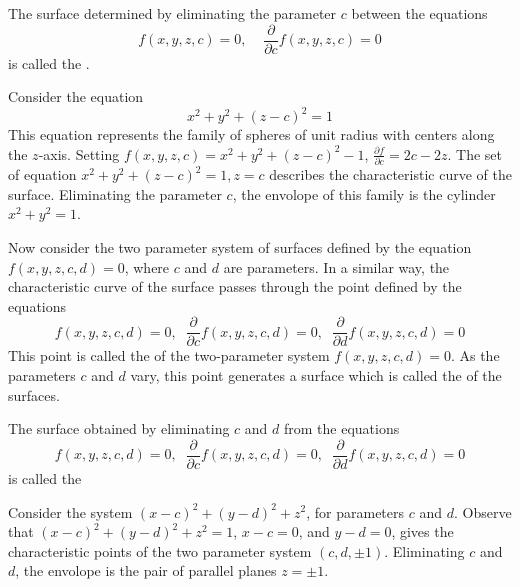     \begin{definition}
        The surface determined by eliminating the parameter $c$ between the equations  \begin{equation*}
            f(x,y,z,c) = 0,\;\;\;\;\frac{\partial}{\partial c}f(x,y,z,c) = 0
        \end{equation*}
        is called the .
    \end{definition}

    \begin{example}
        Consider the equation $$x^2+y^2+(z-c)^2 = 1$$ This equation represents the family of spheres of unit radius with centers along the $z$-axis. Setting $f(x,y,z,c) = x^2+y^2+(z-c)^2-1$, $\frac{\partial f}{\partial c} = 2c-2z$. The set of equation $x^2+y^2+(z-c)^2=1, z =c$ describes the characteristic curve of the surface. Eliminating the parameter $c$, the envolope of this family is the cylinder $x^2+y^2=1$.
    \end{example}

    Now consider the two parameter system of surfaces defined by the equation $f(x,y,z,c,d) = 0$, where $c$ and $d$ are parameters. In a similar way, the characteristic curve of the surface passes through the point defined by the equations \begin{equation*}
        f(x,y,z,c,d) = 0,\;\;\frac{\partial }{\partial c}f(x,y,z,c,d) = 0,\;\;\frac{\partial }{\partial d}f(x,y,z,c,d) = 0
    \end{equation*}
    This point is called the  of the two-parameter system $f(x,y,z,c,d) = 0$. As the parameters $c$ and $d$ vary, this point generates a surface which is called the  of the surfaces.

    \begin{definition}
        The surface obtained by eliminating $c$ and $d$ from the equations \begin{equation*}
        f(x,y,z,c,d) = 0,\;\;\frac{\partial }{\partial c}f(x,y,z,c,d) = 0,\;\;\frac{\partial }{\partial d}f(x,y,z,c,d) = 0
    \end{equation*}
        is called the 
    \end{definition}

    \begin{example}
        Consider the system $(x-c)^2+(y-d)^2+z^2$, for parameters $c$ and $d$. Observe that $(x-c)^2+(y-d)^2+z^2=1$, $x-c = 0$, and $y-d = 0$, gives the characteristic points of the two parameter system $(c,d,\pm 1)$. Eliminating $c$ and $d$, the envolope is the pair of parallel planes $z = \pm 1$.
    \end{example}

